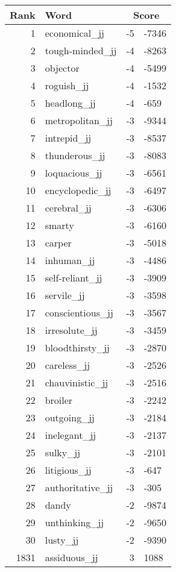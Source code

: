\begin{longtable}[!htbp]{| rlr@{.}l |}
    \hline
    \textbf{Rank} & \textbf{Word} & \multicolumn{2}{c|}{\textbf{Score}} \\
    \hline
    \endhead
    1 & economical\_jj & -5 & -7346 \\
    2 & tough-minded\_jj & -4 & -8263 \\
    3 & objector & -4 & -5499 \\
    4 & roguish\_jj & -4 & -1532 \\
    5 & headlong\_jj & -4 & -659 \\
    6 & metropolitan\_jj & -3 & -9344 \\
    7 & intrepid\_jj & -3 & -8537 \\
    8 & thunderous\_jj & -3 & -8083 \\
    9 & loquacious\_jj & -3 & -6561 \\
    10 & encyclopedic\_jj & -3 & -6497 \\
    11 & cerebral\_jj & -3 & -6306 \\
    12 & smarty & -3 & -6160 \\
    13 & carper & -3 & -5018 \\
    14 & inhuman\_jj & -3 & -4486 \\
    15 & self-reliant\_jj & -3 & -3909 \\
    16 & servile\_jj & -3 & -3598 \\
    17 & conscientious\_jj & -3 & -3567 \\
    18 & irresolute\_jj & -3 & -3459 \\
    19 & bloodthirsty\_jj & -3 & -2870 \\
    20 & careless\_jj & -3 & -2526 \\
    21 & chauvinistic\_jj & -3 & -2516 \\
    22 & broiler & -3 & -2242 \\
    23 & outgoing\_jj & -3 & -2184 \\
    24 & inelegant\_jj & -3 & -2137 \\
    25 & sulky\_jj & -3 & -2101 \\
    26 & litigious\_jj & -3 & -647 \\
    27 & authoritative\_jj & -3 & -305 \\
    28 & dandy & -2 & -9874 \\
    29 & unthinking\_jj & -2 & -9650 \\
    30 & lusty\_jj & -2 & -9390 \\
    1831 & assiduous\_jj & 3 & 1088 \\

\end{longtable}
